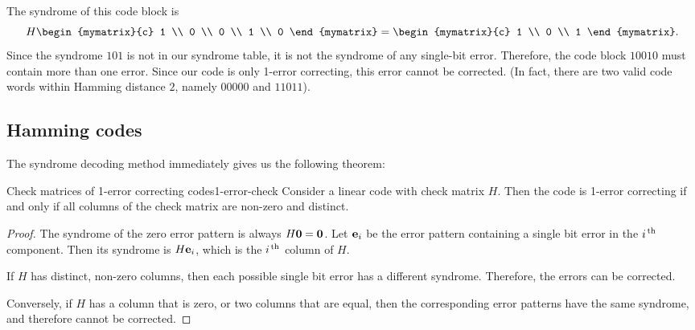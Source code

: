 \begin{solution}
  The syndrome of this code block is
  \begin{equation*}
    H \begin{mymatrix}{c} 1 \\ 0 \\ 0 \\ 1 \\ 0 \end{mymatrix}
    = \begin{mymatrix}{c} 1 \\ 0 \\ 1 \end{mymatrix}.
  \end{equation*}
  Since the syndrome $101$ is not in our syndrome table, it is not the
  syndrome of any single-bit error. Therefore, the code block $10010$
  must contain more than one error. Since our code is only 1-error
  correcting, this error cannot be corrected. (In fact, there are two
  valid code words within Hamming distance $2$, namely $00000$ and
  $11011$).
\end{solution}

\subsection*{Hamming codes}

The syndrome decoding method immediately gives us the following
theorem:

\begin{theorem}{Check matrices of 1-error correcting codes}{1-error-check}
  Consider a linear code with check matrix $H$. Then the code is
  1-error correcting if and only if all columns of the check matrix
  are non-zero and distinct.
\end{theorem}

\begin{proof}
  The syndrome of the zero error pattern is always
  $H\vect{0}=\vect{0}$. Let $\vect{e}_i$ be the error pattern
  containing a single bit error in the $i^{\,\rm th}$ component. Then its
  syndrome is $H\vect{e}_i$, which is the $i^{\,\rm th}$ column of $H$.

  If $H$ has distinct, non-zero columns, then each possible single bit
  error has a different syndrome. Therefore, the errors can be
  corrected.

  Conversely, if $H$ has a column that is zero, or two columns that
  are equal, then the corresponding error patterns have the same
  syndrome, and therefore cannot be corrected.
\end{proof}

